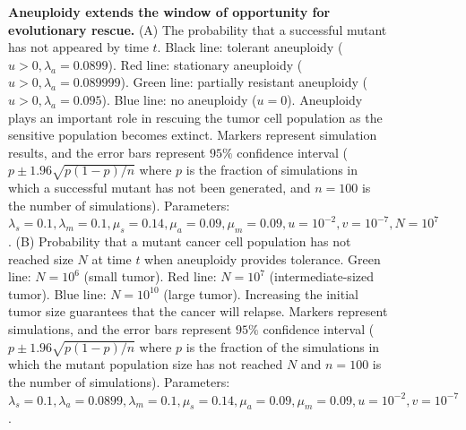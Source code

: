 \documentclass[12pt]{extarticle}
\begin{document}
\begin{figure}
\begin{subfigure}{0.5\textwidth}
\end{subfigure}
\caption{\textbf{Aneuploidy extends the window of opportunity for evolutionary rescue.}
(A) The probability that a successful mutant has not appeared by time $t$. Black line: tolerant aneuploidy ($u>0, \lambda_a=0.0899$). Red line: stationary aneuploidy ($u>0, \lambda_a=0.089999$). Green line: partially resistant aneuploidy ($u>0, \lambda_a=0.095$). Blue line: no aneuploidy ($u=0$). Aneuploidy plays an important role in rescuing the tumor cell population as the sensitive population becomes extinct. Markers represent simulation results, and the error bars represent $95\%$ confidence interval ($p\pm1.96\sqrt{p\left(1-p\right)/n}$ where $p$ is the fraction of simulations in which a successful mutant has not been generated, and $n=100$ is the number of simulations). Parameters: $\lambda_s=0.1,\lambda_m=0.1,\mu_s=0.14,\mu_a=0.09,\mu_m=0.09, u=10^{-2}, v=10^{-7},N=10^7$. %
(B) Probability that a mutant cancer cell population has not reached size $N$ at time $t$ when aneuploidy provides tolerance. Green line: $N=10^6$ (small tumor). Red line: $N=10^7$ (intermediate-sized tumor). Blue line: $N=10^{10}$ (large tumor). Increasing the initial tumor size guarantees that the cancer will relapse. Markers represent simulations, and the error bars represent $95\%$ confidence interval ($p\pm1.96\sqrt{p\left(1-p\right)/n}$ where $p$ is the fraction of the simulations in which the mutant population size has not reached $N$ and $n=100$ is the number of simulations).
Parameters: $\lambda_s=0.1,\lambda_a=0.0899,\lambda_m=0.1,\mu_s=0.14,\mu_a=0.09,\mu_m=0.09, u=10^{-2}, v=10^{-7}$.}
\label{cdffig}
\end{figure}

\end{document}
